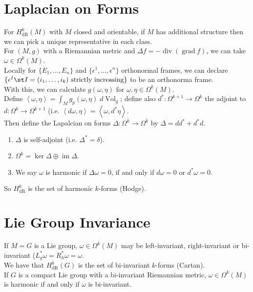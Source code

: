 \documentclass[11pt]{article}
\begin{document}
\section*{Laplacian on Forms}
\label{sec:org0a802bb}
For \(H^{k}_{\text{dR}}(M)\) with \(M\) closed and orientable, if \(M\) has additional structure then we can pick a unique representative in each class.\\
For \((M,g)\) with a Riemannian metric and \(\Delta f=-\operatorname{div}(\operatorname{grad}f)\), we can take \(\omega\in\Omega^{k}(M)\).\\
Locally for \(\{E_{1},\ldots,E_{n}\}\) and \(\{\epsilon^{1},\ldots,\epsilon^{n}\}\) orthonormal frames, we can declare \(\{\epsilon^{I}\st I=(i_{1},\ldots,i_{k})\text{ strictly increasing}\}\) to be an orthonorma frame.\\
With this, we can calculate \(g(\omega,\eta)\) for \(\omega,\eta\in\Omega^{k}(M)\).\\
Define \(\left\langle \omega,\eta \right\rangle=\int_{M}g_{p}(\omega,\eta)\;d\operatorname{Vol}_{g}\); define also \(d^{*}:\Omega^{k+1}\to\Omega^{k}\) the adjoint to \(d:\Omega^{k}\to\Omega^{k+1}\) (i.e. \(\left\langle d\omega,\eta \right\rangle=\left\langle \omega,d^{*}\eta \right\rangle\).\\
Then define the Lapalcian on forms \(\Delta:\Omega^{k}\to\Omega^{k}\) by \(\Delta=dd^{*}+d^{*}d\).\\
\begin{enumerate}
\item \(\Delta\) is self-adjoint (i.e. \(\Delta^{*}=\delta\)).\\
\item \(\Omega^{k}=\ker\Delta\oplus\operatorname{im}\Delta\).\\
\item We say \(\omega\) is harmonic if \(\Delta\omega=0\), if and only if \(d\omega=0\) or \(d^{*}\omega=0\).\\
\end{enumerate}

So \(H^{k}_{\text{dR}}\) is the set of harmonic \(k\)-forms (Hodge).\\
\section*{Lie Group Invariance}
\label{sec:org0b73e5e}
If \(M=G\) is a Lie group, \(\omega\in\Omega^{k}(M)\) may be left-invariant, right-invariant or bi-invariant (\(L^{*}_{g}\omega=R^{*}_{h}\omega=\omega\).\\
We have that \(H^{k}_{\text{dR}}(G)\) is the set of bi-invariant \(k\)-forms (Cartan).\\
If \(G\) is a compact Lie group with a bi-invariant Riemannian metric, \(\omega\in\Omega^{k}(M)\) is harmonic if and only if \(\omega\) is bi-invariant.\\
\end{document}
